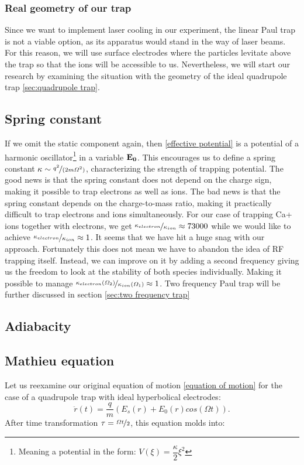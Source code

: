 \subsubsection{Real geometry of our trap}
Since we want to implement laser cooling in our experiment, the linear Paul trap is not a viable option, as its apparatus would stand in the way of laser beams. For this reason, we will use surface electrodes where the particles levitate above the trap so that the ions will be accessible to us. Nevertheless, we will start our research by examining the situation with the geometry of the ideal quadrupole trap \ref{sec:quadrupole trap}.

\subsection{Spring constant}

If we omit the static component again, then \eqref{effective potential} is a potential of a harmonic oscillator\footnote{Meaning a potential in the form: $V(\xi) = \dfrac{\kappa}{2} \xi^2$} in a variable $\vb{E_0}$. This encourages us to define a spring constant $\kappa \sim \nicefrac{q^2}{(2 m \Omega^2)}$, characterizing the strength of trapping potential. The good news is that the spring constant does not depend on the charge sign, making it possible to trap electrons as well as ions. The bad news is that the spring constant depends on the charge-to-mass ratio, making it practically difficult to trap electrons and ions simultaneously. For our case of trapping Ca+ ions together with electrons, we get $\nicefrac{\kappa_{electron}}{\kappa_{ion}} \approx 73000$ while we would like to achieve $\nicefrac{\kappa_{electron}}{\kappa_{ion}} \approx 1$. It seems that we have hit a huge snag with our approach. Fortunately this does not mean we have to abandon the idea of RF trapping itself. Instead, we can improve on it by adding a second frequency giving us the freedom to look at the stability of both species individually. Making it possible to manage $\nicefrac{\kappa_{electron}(\Omega_2)}{\kappa_{ion}(\Omega_1)} \approx 1$. Two frequency Paul trap will be further discussed in section \ref{sec:two frequency trap}
\subsection{Adiabacity}

\xxx{\dots}

\subsection{Mathieu equation}
Let us reexamine our original equation of motion \eqref{equation of motion} for the case of a quadrupole trap with ideal hyperbolical electrodes:
\begin{equation}
	\ddot{r}(t) = \dfrac{q}{m} \left( E_s(r) + E_0(r) cos(\Omega t) \right).
\end{equation}
After time transformation $\tau = \nicefrac{\Omega t}{2}$, this equation molds into:

